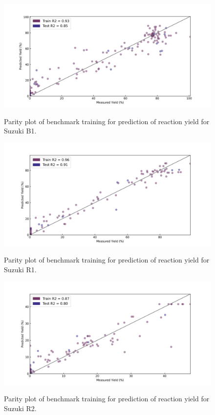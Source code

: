 \begin{figure}
\caption{ Parity plot of benchmark training for prediction of reaction yield for Suzuki B1.}\includegraphics[width=1\textwidth]{gfx/Appendix/baumgartner_suzuki_parity_plot.png}
\label{fig:5}
\end{figure}

\begin{figure}
\caption{Parity plot of benchmark training for prediction of reaction yield for Suzuki R1.}\includegraphics[width=1\textwidth]{gfx/Appendix/reizman_suzuki_case_1_parity_plot.png}
\label{fig:6}
\end{figure}

\begin{figure}
\caption{ Parity plot of benchmark training for prediction of reaction yield for Suzuki R2.}\includegraphics[width=1\textwidth]{gfx/Appendix/reizman_suzuki_case_2_parity_plot.png}
\label{fig:7}
\end{figure}

